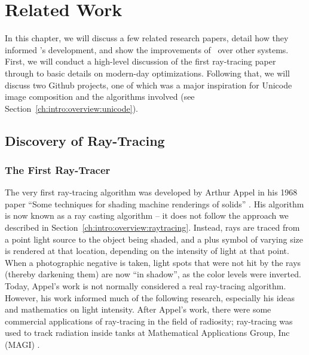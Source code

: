 %
%
\chapter{Related Work}\label{ch:relatedwork}

In this chapter, we will discuss a few related research papers, detail how they informed \name's development, and show the improvements of \name\ over other systems.
First, we will conduct a high-level discussion of the first ray-tracing paper through to basic details on modern-day optimizations.
Following that, we will discuss two Github projects, one of which was a major inspiration for Unicode image composition and the algorithms involved (see Section~\ref{ch:intro:overview:unicode}).

\section{Discovery of Ray-Tracing}

\subsection{The First Ray-Tracer}

The very first ray-tracing algorithm was developed by Arthur Appel in his 1968 paper ``Some techniques for shading machine renderings of solids'' \cite{appel1968some}.
His algorithm is now known as a ray casting algorithm -- it does not follow the approach we described in Section~\ref{ch:intro:overview:raytracing}.
Instead, rays are traced from a point light source to the object being shaded, and a plus symbol of varying size is rendered at that location, depending on the intensity of light at that point.
When a photographic negative is taken, light spots that were not hit by the rays (thereby darkening them) are now ``in shadow'', as the color levels were inverted.
Today, Appel's work is not normally considered a real ray-tracing algorithm.
However, his work informed much of the following research, especially his ideas and mathematics on light intensity.
After Appel's work, there were some commercial applications of ray-tracing in the field of radiosity; ray-tracing was used to track radiation inside tanks at Mathematical Applications Group, Inc (MAGI) \cite{whitted2018explains}.


